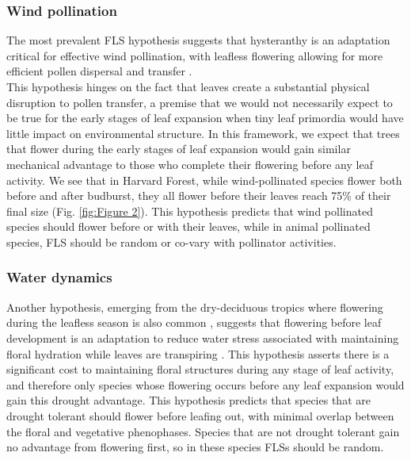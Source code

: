 \documentclass[12pt]{article}\usepackage[]{graphicx}\usepackage[]{color}
\begin{document}
\subsubsection*{ Wind pollination}
\indent\indent The most prevalent FLS hypothesis suggests that hysteranthy is an adaptation critical for effective wind pollination, with leafless flowering allowing for more efficient pollen dispersal and transfer \citep{Whitehead1969, Spurr1980,Friedman2009}.\\
 This hypothesis hinges on the fact that leaves create a substantial physical disruption to pollen transfer, a premise that we would not necessarily expect to be true for the early stages of leaf expansion when tiny leaf primordia would have little impact on environmental structure. In this framework, we expect that trees that flower during the early stages of leaf expansion would gain similar mechanical advantage to those who complete their flowering before any leaf activity. We see that in Harvard Forest, while wind-pollinated species flower both before and after budburst, they all flower before their leaves reach 75\% of their final size (Fig. \ref{fig:Figure 2}). This hypothesis predicts that wind pollinated species should flower before or with their leaves, while in animal pollinated species, FLS should be random or co-vary with pollinator activities. %

\subsubsection*{Water dynamics}
\indent\indent Another hypothesis, emerging from the dry-deciduous tropics where flowering during the leafless season is also common \citep{Janzen1967}, suggests that flowering before leaf development is an adaptation to reduce water stress associated with maintaining floral hydration while leaves are transpiring \citep{Franklin2016}. This hypothesis asserts there is a significant cost to maintaining floral structures during any stage of leaf activity, and therefore only species whose flowering occurs before any leaf expansion would gain this drought advantage. This hypothesis predicts that species that are drought tolerant should flower before leafing out, with minimal overlap between the floral and vegetative phenophases. Species that are not drought tolerant gain no advantage from flowering first, so in these species FLSs should be random.
\end{document}
